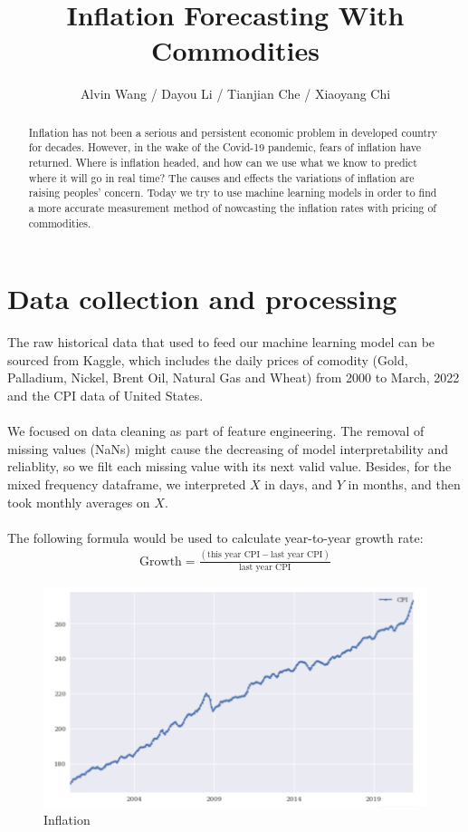 \documentclass[reqno]{amsart}
\theoremstyle{definition}
\begin{document}
\author{Alvin Wang / Dayou Li / Tianjian Che / Xiaoyang Chi}
\title{Inflation Forecasting With Commodities}
\maketitle
\begin{abstract}
Inflation has not been a serious and persistent economic problem in developed country for decades. However, in the wake of the Covid-19 pandemic, fears of inflation have returned. Where is inflation headed, and how can we use what we know to predict where it will go in real time? The causes and effects the variations of inflation are raising peoples' concern. Today we try to use machine learning models in order to find a more accurate measurement method of nowcasting the inflation rates with pricing of commodities.
\end{abstract}
\section{Data collection and processing}
The raw historical data that used to feed our machine learning model can be sourced from Kaggle, which includes the daily prices of comodity (Gold, Palladium, Nickel, Brent Oil, Natural Gas and Wheat) from 2000 to March, 2022 and the CPI data of United States.\\
~\\

We focused on data cleaning as part of feature engineering. The removal of missing values (NaNs) might cause the decreasing of model interpretability and reliablity, so we filt each missing value with its next valid value. Besides, for the mixed frequency dataframe, we interpreted $X$ in days, and $Y$ in months, and then took monthly averages on $X$.\\
~\\

The following formula would be used to calculate year-to-year growth rate:
\begin{align*}
\mbox{Growth} = \frac{(\mbox{this year CPI}-\mbox{last year CPI})}{\mbox{last year CPI}}
\end{align*}

\begin{figure}[t]
\centering
\caption{Inflation}
\includegraphics[scale=0.7]{inflation.png}
\end{figure}
\end{document}
